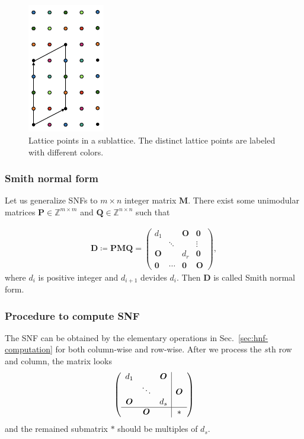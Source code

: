 \begin{figure}[htb]
  \centering
  \includegraphics[width=0.3\textwidth]{figure/fig_supercell.png}
  \caption{
    Lattice points in a sublattice.
    The distinct lattice points are labeled with different colors.
  }
  \label{fig:hnf_supercell}
\end{figure}



\subsubsection{Smith normal form}

Let us generalize SNFs to $m \times n$ integer matrix $\bm{M}$.
There exist some unimodular matrices $\bm{P} \in \mathbb{Z}^{m \times m}$ and $\bm{Q} \in \mathbb{Z}^{n \times n}$ such that

\begin{align}
    \bm{D}
    \coloneqq
    \bm{PMQ}
    =
    \begin{pmatrix}
        d_{1}  &        & \bm{O} & \bm{0} \\
               & \ddots &        & \vdots \\
        \bm{O} &        & d_{r}  & \bm{0} \\
        \bm{0} & \cdots & \bm{0} & \bm{O}
    \end{pmatrix},
\end{align}
where $d_{i}$ is positive integer and $d_{i+1}$ devides $d_{i}$.
Then $\bm{D}$ is called Smith normal form.

\subsubsection{Procedure to compute SNF}

The SNF can be obtained by the elementary operations in Sec.~\ref{sec:hnf-computation} for both column-wise and row-wise.
After we process the $s$th row and column, the matrix looks
\begin{align*}
  \left(
    \begin{array}{ccc|c}
      d_{1} &        & \bm{O} &        \\
             & \ddots &        & \bm{O} \\
      \bm{O} &        & d_{s}  &        \\ \hline
             & \bm{O} &        & \ast   \\
    \end{array}
  \right)
\end{align*}
and the remained submatrix $\ast$ should be multiples of $d_{s}$.

